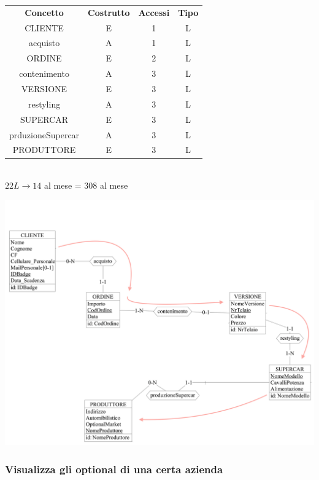 \documentclass[11pt]{article}
\begin{document}
\begin{table}[H]
    \centering
    \begin{tabular}{ c c c c }
        \rowcolor{red!20!}
        \textbf{Concetto} & \textbf{Costrutto}  & \textbf{Accessi} &
        \textbf{Tipo}\\ 
        CLIENTE & E & 1 & L \\
        acquisto & A & 1 & L \\ 
        ORDINE & E & 2 & L \\ 
        contenimento & A & 3 & L \\
        VERSIONE & E & 3 & L \\ 
        restyling & A & 3 & L \\
        SUPERCAR & E & 3 & L \\
        prduzioneSupercar & A & 3 & L \\
        PRODUTTORE & E & 3 & L \\
    \end{tabular}\\
        \( 22L  \rightarrow 14 \) al mese = \( 308 \) al mese
\end{table}

\begin{center}
    \includegraphics[scale=0.50]{images/navigationSchemes/ordiniCliente.png}
\end{center}

\subsubsection{Visualizza gli optional di una certa azienda} 
\end{document}
